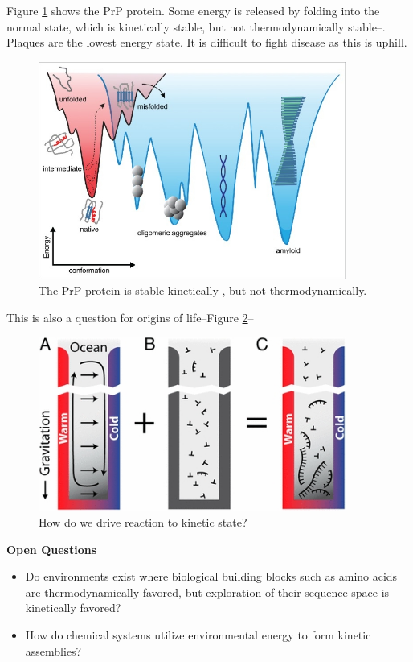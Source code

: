 \documentclass[]{article}
\begin{document}
Figure \ref{fig:prions} shows the PrP protein. Some energy is released by folding into the normal state, which is kinetically stable, but not thermodynamically stable--\cite{dee2016comparing}. Plaques are the lowest energy state. It is difficult to fight disease as this is uphill.

\begin{figure}[H]
	\caption{The PrP protein is stable kinetically , but not thermodynamically.} \label{fig:prions} 
	\includegraphics[width=0.9\textwidth]{prions}
\end{figure}

This is also a question for origins of life--Figure \ref {fig:EnergyForOrigin}--\cite{mast2013escalation}
\begin{figure}[H]
	\caption{How do we drive reaction to kinetic state?} \label{fig:EnergyForOrigin} 
	\includegraphics[width=0.9\textwidth]{EnergyForOrigin}
\end{figure}

\textbf{Open Questions}
\begin{itemize}
	\item Do environments exist where biological building
	blocks such as amino acids are
	thermodynamically favored, but exploration of
	their sequence space is kinetically favored?
	\item How do chemical systems utilize environmental
	energy to form kinetic assemblies?
\end{itemize}
\end{document}
